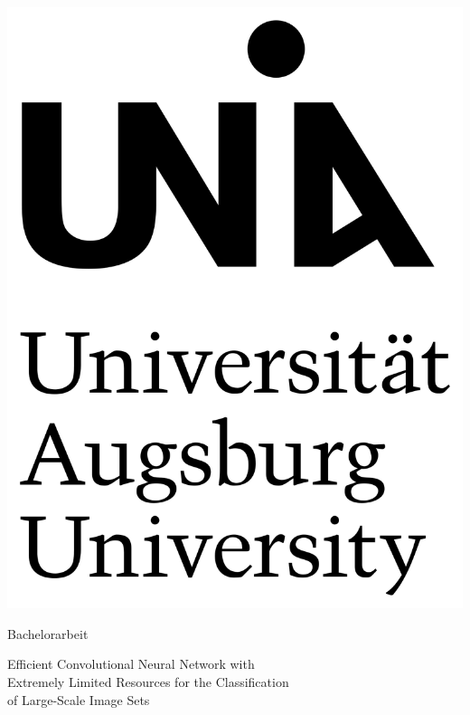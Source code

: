 \documentclass[12pt,a4paper]{scrartcl}
\numberwithin{equation}{section}
\begin{document}
  \pagestyle{empty}

  \begin{titlepage}

    \includegraphics[scale=0.05]{logo_uni} 
    \vspace*{2cm} 

 \begin{center} \large 
    
    Bachelorarbeit
    \vspace*{2cm}

    
    {\LARGE Efficient Convolutional Neural Network with \\Extremely Limited Resources 
    for the Classification \\of Large-Scale Image Sets}
    \vspace*{2.5cm}


\end{center}
\end{titlepage}
\end{document}
